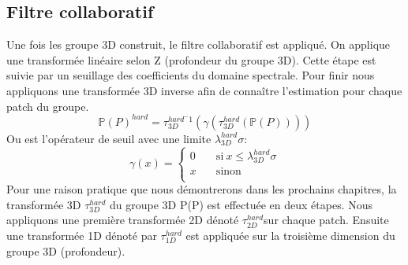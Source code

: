 \subsection{Filtre collaboratif}
Une fois les groupe 3D construit, le filtre collaboratif est appliqué. On applique une transformée linéaire selon Z (profondeur du groupe 3D). Cette étape est suivie par un seuillage des coefficients du domaine spectrale. Pour finir nous appliquons une transformée 3D inverse afin de connaître l'estimation pour chaque patch du groupe. 
\begin{equation}
\mathbb{P}(P)^{hard} = \tau^{hard^-1}_{3D} (\gamma (\tau^{hard}_{3D}(\mathbb{P}(P))))
\end{equation}
Ou \gamma \: est l'opérateur de seuil avec une limite \(\lambda^{hard}_{3D}\sigma\):
\[ \gamma(x) =
  \begin{cases}
    0       & \quad \text{si} \: x  \leq \lambda^{hard}_{3D}\sigma \\
    x       & \quad \text{sinon}\\
  \end{cases}
\]
Pour une raison pratique que nous démontrerons dans les prochains chapitres, la transformée 3D \(\tau^{hard}_{3D}\) du groupe 3D P(P) est effectuée en deux étapes. Nous appliquons une première transformée 2D dénoté \(\tau^{hard}_{2D}\)sur chaque patch. Ensuite une transformée 1D dénoté par \(\tau^{hard}_{1D}\) est appliquée sur la troisième dimension du groupe 3D (profondeur).  

